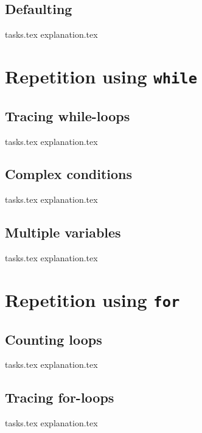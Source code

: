     \section{Defaulting}
    {tasks.tex}              \newpage
    {explanation.tex}           \newpage

    \chapter{Repetition using \texttt{while}}
    \newpage

    \section{Tracing while-loops}
    {tasks.tex}           \newpage
    {explanation.tex}        \newpage

    \section{Complex conditions}
    {tasks.tex} \newpage
    {explanation.tex} \newpage

    \section{Multiple variables}
    {tasks.tex}     \newpage
    {explanation.tex}  \newpage

    \chapter{Repetition using \texttt{for}}
    \newpage

    \section{Counting loops}
    {tasks.tex}         \newpage
    {explanation.tex}      \newpage

    \section{Tracing for-loops}
    {tasks.tex}               \newpage
    {explanation.tex}            \newpage

